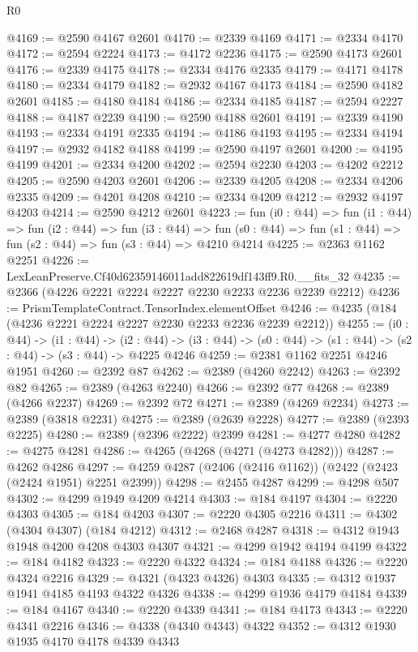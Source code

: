 \begin{lexlean}{R0}
\begin{coremodule}
@4169 := @2590 @4167 @2601
@4170 := @2339 @4169
@4171 := @2334 @4170
@4172 := @2594 @2224
@4173 := @4172 @2236
@4175 := @2590 @4173 @2601
@4176 := @2339 @4175
@4178 := @2334 @4176 @2335
@4179 := @4171 @4178
@4180 := @2334 @4179
@4182 := @2932 @4167 @4173
@4184 := @2590 @4182 @2601
@4185 := @4180 @4184
@4186 := @2334 @4185
@4187 := @2594 @2227
@4188 := @4187 @2239
@4190 := @2590 @4188 @2601
@4191 := @2339 @4190
@4193 := @2334 @4191 @2335
@4194 := @4186 @4193
@4195 := @2334 @4194
@4197 := @2932 @4182 @4188
@4199 := @2590 @4197 @2601
@4200 := @4195 @4199
@4201 := @2334 @4200
@4202 := @2594 @2230
@4203 := @4202 @2212
@4205 := @2590 @4203 @2601
@4206 := @2339 @4205
@4208 := @2334 @4206 @2335
@4209 := @4201 @4208
@4210 := @2334 @4209
@4212 := @2932 @4197 @4203
@4214 := @2590 @4212 @2601
@4223 := fun (i0 : @44) =>
  fun (i1 : @44) =>
  fun (i2 : @44) =>
  fun (i3 : @44) =>
  fun (s0 : @44) => fun (s1 : @44) => fun (s2 : @44) => fun (s3 : @44) => @4210 @4214
@4225 := @2363 @1162 @2251
@4226 := LexLeanPreserve.Cf40d62359146011add822619df143ff9.R0.__fits_32
@4235 := @2366 (@4226 @2221 @2224 @2227 @2230 @2233 @2236 @2239 @2212)
@4236 := PrismTemplateContract.TensorIndex.elementOffset
@4246 := @4235 (@184 (@4236 @2221 @2224 @2227 @2230 @2233 @2236 @2239 @2212))
@4255 := (i0 : @44) ->
  (i1 : @44) ->
  (i2 : @44) -> (i3 : @44) -> (s0 : @44) -> (s1 : @44) -> (s2 : @44) -> (s3 : @44) -> @4225 @4246
@4259 := @2381 @1162 @2251 @4246 @1951
@4260 := @2392 @87
@4262 := @2389 (@4260 @2242)
@4263 := @2392 @82
@4265 := @2389 (@4263 @2240)
@4266 := @2392 @77
@4268 := @2389 (@4266 @2237)
@4269 := @2392 @72
@4271 := @2389 (@4269 @2234)
@4273 := @2389 (@3818 @2231)
@4275 := @2389 (@2639 @2228)
@4277 := @2389 (@2393 @2225)
@4280 := @2389 (@2396 @2222) @2399
@4281 := @4277 @4280
@4282 := @4275 @4281
@4286 := @4265 (@4268 (@4271 (@4273 @4282)))
@4287 := @4262 @4286
@4297 := @4259 @4287 (@2406 (@2416 @1162)) (@2422 (@2423 (@2424 @1951) @2251 @2399))
@4298 := @2455 @4287
@4299 := @4298 @507
@4302 := @4299 @1949 @4209 @4214
@4303 := @184 @4197
@4304 := @2220 @4303
@4305 := @184 @4203
@4307 := @2220 @4305 @2216
@4311 := @4302 (@4304 @4307) (@184 @4212)
@4312 := @2468 @4287
@4318 := @4312 @1943 @1948 @4200 @4208 @4303 @4307
@4321 := @4299 @1942 @4194 @4199
@4322 := @184 @4182
@4323 := @2220 @4322
@4324 := @184 @4188
@4326 := @2220 @4324 @2216
@4329 := @4321 (@4323 @4326) @4303
@4335 := @4312 @1937 @1941 @4185 @4193 @4322 @4326
@4338 := @4299 @1936 @4179 @4184
@4339 := @184 @4167
@4340 := @2220 @4339
@4341 := @184 @4173
@4343 := @2220 @4341 @2216
@4346 := @4338 (@4340 @4343) @4322
@4352 := @4312 @1930 @1935 @4170 @4178 @4339 @4343

\end{coremodule}
\end{lexlean}
